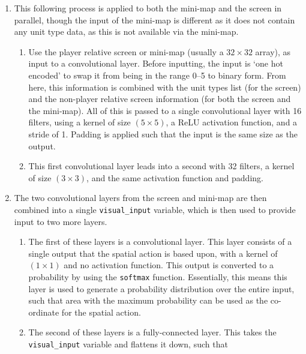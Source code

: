 \begin{enumerate}
    \item This following process is applied to both the mini-map and the screen
        in parallel, though the input of the mini-map is different as it does
        not contain any unit type data, as this is not available via the
        mini-map.
        \begin{enumerate}
            \item Use the player relative screen or mini-map (usually a $32
                \times 32$ array), as input to a convolutional layer. Before
                inputting, the input is `one hot encoded' to swap it from being
                in the range 0--5 to binary form. From here, this information is
                combined with the unit types list (for the screen) and the
                non-player relative screen information (for both the screen and
                the mini-map). All of this is passed to a single convolutional
                layer with 16 filters, using a kernel of size $(5 \times 5)$, a
                ReLU activation function, and a stride of 1. Padding is applied
                such that the input is the same size as the output.
            \item This first convolutional layer leads into a second with 32
                filters, a kernel of size $(3 \times 3)$, and the same
                activation function and padding.
    \end{enumerate}
    \item The two convolutional layers from the screen and mini-map are then
        combined into a single \texttt{visual\_input} variable, which is then
        used to provide input to two more layers.
    \begin{enumerate}
        \item The first of these layers is a convolutional layer. This layer
            consists of a single output that the spatial action is based upon,
            with a kernel of $(1 \times 1)$ and no activation function. This
            output is converted to a probability by using the \texttt{softmax}
            function. Essentially, this means this layer is used to generate a
            probability distribution over the entire input, such that area with
            the maximum probability can be used as the co-ordinate for the
            spatial action.
        \item The second of these layers is a fully-connected layer. This takes
            the \texttt{visual\_input} variable and flattens it down, such that

\end{enumerate}
\end{enumerate}
